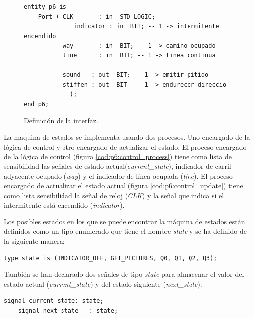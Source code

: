 \documentclass{article}
\begin{document}
\begin{figure}[h]
	\begin{lstlisting}[style=vhdl]
entity p6 is
    Port ( CLK       : in  STD_LOGIC;
			  indicator : in  BIT; -- 1 -> intermitente encendido
           way       : in  BIT; -- 1 -> camino ocupado
           line      : in  BIT; -- 1 -> linea continua
			  
           sound   : out  BIT; -- 1 -> emitir pitido
           stiffen : out  BIT  -- 1 -> endurecer direccio
			 );
end p6;
	\end{lstlisting}
	\caption{Definición de la interfaz.}
	\label{cod:p6:entity}
\end{figure}

La maquina de estados se implementa usando dos procesos. Uno encargado de la lógica de control y otro encargado de actualizar el estado. El proceso encargado de la lógica de control (figura \ref{cod:p6:control_process}) tiene como lista de sensibilidad las señales de estado actual(\emph{current\_state}), indicador de carril adyacente ocupado (\emph{way}) y el indicador  de línea ocupada (\emph{line}). El proceso encargado de actualizar el estado actual (figura \ref{cod:p6:control_update}) tiene como lista sensibilidad la señal de reloj (\emph{CLK}) y la señal que indica si el intermitente está encendido (\emph{indicator}).

Los posibles estados en los que se puede encontrar la máquina de estados están definidos como un tipo enumerado que tiene el nombre \emph{state} y se ha definido de la siguiente manera:
\begin{lstlisting}[style=vhdl]
	type state is (INDICATOR_OFF, GET_PICTURES, Q0, Q1, Q2, Q3);
\end{lstlisting}

También se han declarado dos señales de tipo \emph{state} para almacenar el valor del estado actual (\emph{current\_state}) y del estado siguiente (\emph{next\_state}):
\begin{lstlisting}[style=vhdl]
	signal current_state: state;
	signal next_state   : state;
\end{lstlisting}
\end{document}
